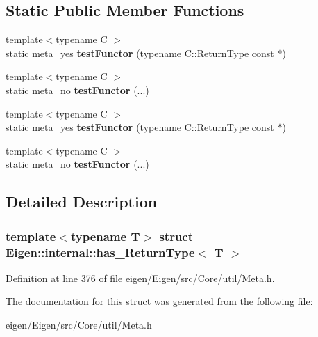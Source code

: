 \subsection*{Static Public Member Functions}
\begin{DoxyCompactItemize}
\item 
\mbox{\label{struct_eigen_1_1internal_1_1has___return_type_a2e051cf8e6689c9d4a93726ad162172a}} 
{\footnotesize template$<$typename C $>$ }\\static \hyperlink{struct_eigen_1_1internal_1_1meta__yes}{meta\+\_\+yes} {\bfseries test\+Functor} (typename C\+::\+Return\+Type const $\ast$)
\item 
\mbox{\label{struct_eigen_1_1internal_1_1has___return_type_a8383cc58906de2f78c9c03671a97e403}} 
{\footnotesize template$<$typename C $>$ }\\static \hyperlink{struct_eigen_1_1internal_1_1meta__no}{meta\+\_\+no} {\bfseries test\+Functor} (...)
\item 
\mbox{\label{struct_eigen_1_1internal_1_1has___return_type_a2e051cf8e6689c9d4a93726ad162172a}} 
{\footnotesize template$<$typename C $>$ }\\static \hyperlink{struct_eigen_1_1internal_1_1meta__yes}{meta\+\_\+yes} {\bfseries test\+Functor} (typename C\+::\+Return\+Type const $\ast$)
\item 
\mbox{\label{struct_eigen_1_1internal_1_1has___return_type_a8383cc58906de2f78c9c03671a97e403}} 
{\footnotesize template$<$typename C $>$ }\\static \hyperlink{struct_eigen_1_1internal_1_1meta__no}{meta\+\_\+no} {\bfseries test\+Functor} (...)
\end{DoxyCompactItemize}


\subsection{Detailed Description}
\subsubsection*{template$<$typename T$>$\newline
struct Eigen\+::internal\+::has\+\_\+\+Return\+Type$<$ T $>$}



Definition at line \hyperlink{eigen_2_eigen_2src_2_core_2util_2_meta_8h_source_l00376}{376} of file \hyperlink{eigen_2_eigen_2src_2_core_2util_2_meta_8h_source}{eigen/\+Eigen/src/\+Core/util/\+Meta.\+h}.



The documentation for this struct was generated from the following file\+:\begin{DoxyCompactItemize}
\item 
eigen/\+Eigen/src/\+Core/util/\+Meta.\+h\end{DoxyCompactItemize}
